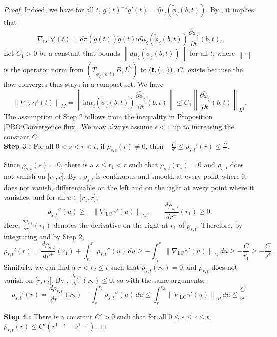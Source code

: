 \documentclass{article}
\theoremstyle{remark}
\theoremstyle{definition}
\newcommand{\LC}{\mathrm{LC}}
\renewcommand{\i}{\boldsymbol{\mathrm{i}}}
\newcommand{\scal}[2]{\left< #1,#2 \right>}
\newcommand{\norme}[1]{\left\| #1 \right\|}
\renewcommand{\leq}{\leqslant}
\renewcommand{\geq}{\geqslant}
\begin{document}
\begin{proof}
Indeed, we have for all $t$, $\tilde{g}(t)^{-1}\tilde{g}'(t) = \i\tilde{\mu}_\zeta(\tilde{\phi}_\zeta(b,t))$. By \cite[Theorem C.1]{GRS}, it implies that
$$
\nabla_{\LC}\gamma'(t) = d\pi(\tilde{g}(t))\tilde{g}(t)\i d\tilde{\mu}_\zeta(\tilde{\phi}_\zeta(b,t))\frac{\partial\tilde{\phi}_\zeta}{\partial t}(b,t).
$$
Let $C_1 > 0$ be a constant that bounds $\norme{d\tilde{\mu}_\zeta(\tilde{\phi}_\zeta(b,t))}$ for all $t$, where $\norme{\cdot}$ is the operator norm from $(T_{\tilde{\phi}_\zeta(b,t)}B,L^2)$ to $(\frak{k},\scal{\cdot}{\cdot})$. $C_1$ exists because the flow converges thus stays in a compact set. We have
$$
\norme{\nabla_\LC\gamma'(t)}_M = \norme{\i d\tilde{\mu}_\zeta(\tilde{\phi}_\zeta(b,t))\frac{\partial\tilde{\phi}_\zeta}{\partial t}(b,t)} \leq C_1\norme{\frac{\partial\tilde{\phi}_\zeta}{\partial t}(b,t)}_{L^2}.
$$
The assumption of Step 2 follows from the inequality in Proposition \ref{PRO:Convergence flux}. We may always assume $\epsilon < 1$ up to increasing the constant $C$.\\

\noindent\textbf{Step 3 :} For all $0 < s < r < t$, if $\rho_{s,t}(r) \neq 0$, then $-\frac{C}{s^\epsilon} \leq \rho_{s,t}'(r) \leq \frac{C}{r^\epsilon}$.

Since $\rho_{s,t}(s) = 0$, there is a $s \leq r_1 < r$ such that $\rho_{s,t}(r_1) = 0$ and $\rho_{s,t}$ does not vanish on $]r_1,r]$. By \cite[Lemma A.3]{GRS}, $\rho_{s,t}$ is continuous and smooth at every point where it does not vanish, differentiable on the left and on the right at every point where it vanishes, and for all $u \in ]r_1,r]$,
$$
\rho_{s,t}''(u) \geq -\norme{\nabla_\LC\gamma'(u)}_M, \qquad \frac{d\rho_{s,t}}{dr^+}(r_1) \geq 0.
$$
Here, $\frac{d\rho_{s,t}}{dr^+}(r_1)$ denotes the derivative on the right at $r_1$ of $\rho_{s,t}$. Therefore, by integrating and by Step 2,
$$
\rho_{s,t}'(r) = \frac{d\rho_{s,t}}{dr^+}(r_1) + \int_{r_1}^r \rho_{s,t}''(u) \, du \geq -\int_{r_1}^r \norme{\nabla_\LC\gamma'(u)}_M \, du \geq -\frac{C}{r_1^\epsilon} \geq -\frac{C}{s^\epsilon}.
$$
Similarly, we can find a $r < r_2 \leq t$ such that $\rho_{s,t}(r_2) = 0$ and $\rho_{s,t}$ does not vanish on $[r,r_2[$. By \cite[Lemma A.3]{GRS}, $\frac{d\rho_{s,t}}{dr^-}(r_2) \leq 0$, so with the same arguments,
$$
\rho_{s,t}'(r) = \frac{d\rho_{s,t}}{dr^-}(r_2) - \int_r^{r_2} \rho_{s,t}''(u) \, du \leq \int_r^{r_2} \norme{\nabla_\LC\gamma'(u)}_M \, du \leq \frac{C}{r^\epsilon}.
$$

\noindent\textbf{Step 4 :} There is a constant $C' > 0$ such that for all $0 \leq s \leq r \leq t$, $\rho_{s,t}(r) \leq C'(r^{1 - \epsilon} - s^{1 - \epsilon})$.


\end{proof}
\end{document}
